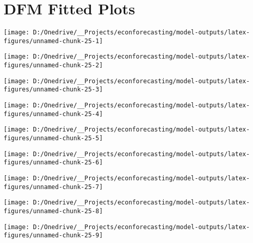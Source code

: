 \documentclass[11pt, letterpaper]{article}\usepackage[]{graphicx}\usepackage[]{color}
\begin{document}
\appendix
\appendixpage
\addappheadtotoc

\section{DFM Fitted Plots}


{\centering \texttt{[image: D:/Onedrive/\_\_Projects/econforecasting/model-outputs/latex-figures/unnamed-chunk-25-1]} 

}




{\centering \texttt{[image: D:/Onedrive/\_\_Projects/econforecasting/model-outputs/latex-figures/unnamed-chunk-25-2]} 

}




{\centering \texttt{[image: D:/Onedrive/\_\_Projects/econforecasting/model-outputs/latex-figures/unnamed-chunk-25-3]} 

}




{\centering \texttt{[image: D:/Onedrive/\_\_Projects/econforecasting/model-outputs/latex-figures/unnamed-chunk-25-4]} 

}




{\centering \texttt{[image: D:/Onedrive/\_\_Projects/econforecasting/model-outputs/latex-figures/unnamed-chunk-25-5]} 

}




{\centering \texttt{[image: D:/Onedrive/\_\_Projects/econforecasting/model-outputs/latex-figures/unnamed-chunk-25-6]} 

}




{\centering \texttt{[image: D:/Onedrive/\_\_Projects/econforecasting/model-outputs/latex-figures/unnamed-chunk-25-7]} 

}




{\centering \texttt{[image: D:/Onedrive/\_\_Projects/econforecasting/model-outputs/latex-figures/unnamed-chunk-25-8]} 

}




{\centering \texttt{[image: D:/Onedrive/\_\_Projects/econforecasting/model-outputs/latex-figures/unnamed-chunk-25-9]} 

}
\end{document}
